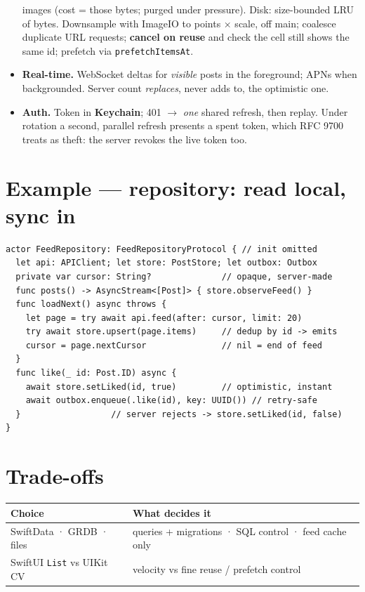 \documentclass[8pt]{extarticle}
\begin{document}
\begin{multicols}{2}
\begin{itemize}
        images (cost = those bytes; purged under pressure). Disk: size-bounded LRU of
        bytes. Downsample with ImageIO to points × scale, off main; coalesce
        duplicate URL requests; \textbf{cancel on reuse} and check the cell still
        shows the same id; prefetch via \texttt{prefetchItemsAt}.
  \item \textbf{Real-time.} WebSocket deltas for \emph{visible} posts in the
        foreground; APNs when backgrounded. Server count \emph{replaces}, never adds to,
        the optimistic one.
  \item \textbf{Auth.} Token in \textbf{Keychain}; 401 $\to$ \emph{one} shared refresh,
        then replay. Under rotation a second, parallel refresh presents a spent token,
        which RFC 9700 treats as theft: the server revokes the live token too.
\end{itemize}

\columnbreak

\section{Example — repository: read local, sync in}
\begin{lstlisting}[language=SwiftSheet]
actor FeedRepository: FeedRepositoryProtocol { // init omitted
  let api: APIClient; let store: PostStore; let outbox: Outbox
  private var cursor: String?              // opaque, server-made
  func posts() -> AsyncStream<[Post]> { store.observeFeed() }
  func loadNext() async throws {
    let page = try await api.feed(after: cursor, limit: 20)
    try await store.upsert(page.items)     // dedup by id -> emits
    cursor = page.nextCursor               // nil = end of feed
  }
  func like(_ id: Post.ID) async {
    await store.setLiked(id, true)         // optimistic, instant
    await outbox.enqueue(.like(id), key: UUID()) // retry-safe
  }                  // server rejects -> store.setLiked(id, false)
}
\end{lstlisting}

\section{Trade-offs}
{\scriptsize
\begin{tabular}{@{}>{\raggedright\arraybackslash}p{27mm}>{\raggedright\arraybackslash}p{42mm}@{}}
\toprule
\textbf{Choice} & \textbf{What decides it} \\
\midrule
SwiftData · GRDB · files & queries + migrations · SQL control · feed cache only \\
SwiftUI \texttt{List} vs UIKit CV & velocity vs fine reuse / prefetch control \\
\bottomrule
\end{tabular}}


\end{multicols}
\end{document}
